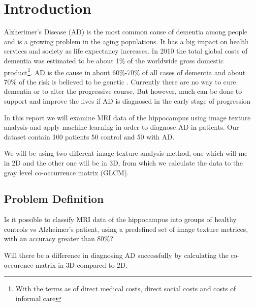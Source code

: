\chapter{Introduction}

Alzherimer's Disease (AD) is the most common cause of dementia among people and is a growing problem in the aging populations. It has a big impact on health services and society as life expectancy increases. In 2010 the total global costs of dementia was estimated to be about 1\% of the worldwide gross domestic product\footnote{With the terms as of direct medical costs, direct social costs and costs of informal care}. AD is the cause in about 60\%-70\% of all cases of dementia\cite{Who} and about 70\% of the risk is believed to be genetic \cite{AlzheimerLancet}. Currently there are no way to cure dementia or to alter the progressive course. But however, much can be done to support and improve the lives if AD is diagnosed in the early stage of progression \cite{Who}

In this report we will examine MRI data of the hippocampus using image texture analysis and apply machine learning in order to diagnose AD in patients. Our dataset contain 100 patients 50 control and 50 with AD.

We will be using two different image texture analysis method, one which will me in 2D\cite{MRfreeborough}\cite{Castellano} and the other one will be in 3D\cite{Voxel}, from which we calculate the data to the gray level co-occ\-urren\-ce matrix (GLCM).



\section{Problem Definition}

Is it possible to classify MRI data of the hippocampus into groups of healthy controls vs Alzheimer's patient, using a predefined set of image texture metrices, with an accuracy great\-er than 80\%?

Will there be a difference in diagnosing AD successfully by calculating the co-occurence matrix in 3D compared to 2D.








